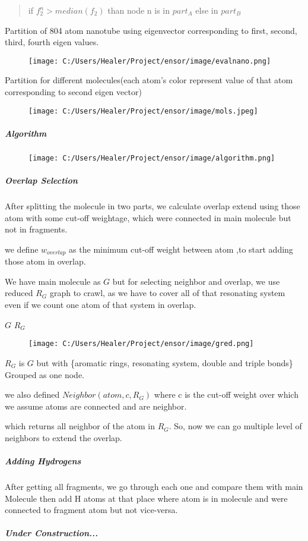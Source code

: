\documentclass[
]{article}
\begin{document}
\begin{quote}
if \(f^n_2>median(f_2)\) than node n is in \(part_A\) else in \(part_B\)
\end{quote}

Partition of 804 atom nanotube using eigenvector corresponding to first,
second, third, fourth eigen values.

\begin{figure}
\centering
\texttt{[image: C:/Users/Healer/Project/ensor/image/evalnano.png]}
\caption{}
\end{figure}

Partition for different molecules(each atom's color represent value of
that atom corresponding to second eigen vector)

\begin{figure}
\centering
\texttt{[image: C:/Users/Healer/Project/ensor/image/mols.jpeg]}
\caption{}
\end{figure}

\hypertarget{header-n1629}{%
\subparagraph{\texorpdfstring{Algorithm
}{Algorithm }}\label{header-n1629}}

\begin{figure}
\centering
\texttt{[image: C:/Users/Healer/Project/ensor/image/algorithm.png]}
\caption{}
\end{figure}

\hypertarget{header-n1631}{%
\subparagraph{Overlap Selection}\label{header-n1631}}

After splitting the molecule in two parts, we calculate overlap extend
using those atom with some cut-off weightage, which were connected in
main molecule but not in fragments.

we define \(w_{overlap}\) as the minimum cut-off weight between atom ,to
start adding those atom in overlap.

We have main molecule as \(G\) but for selecting neighbor and overlap,
we use reduced \(R_G\) graph to crawl, as we have to cover all of that
resonating system even if we count one atom of that system in overlap.

\(G\) \(R_G\)

\begin{figure}
\centering
\texttt{[image: C:/Users/Healer/Project/ensor/image/gred.png]}
\caption{}
\end{figure}

\(R_G\) is \(G\) but with \{aromatic rings, resonating system, double
and triple bonds\} Grouped as one node.

we also defined \(Neighbor(atom,c,R_G)\) where c is the cut-off weight
over which we assume atoms are connected and are neighbor.

which returns all neighbor of the atom in \(R_G\). So, now we can go
multiple level of neighbors to extend the overlap.

\hypertarget{header-n1643}{%
\subparagraph{Adding Hydrogens}\label{header-n1643}}

After getting all fragments, we go through each one and compare them
with main Molecule then add H atoms at that place where atom is in
molecule and were connected to fragment atom but not vice-versa.

\hypertarget{header-n1645}{%
\subparagraph{Under Construction...}\label{header-n1645}}
\end{document}
